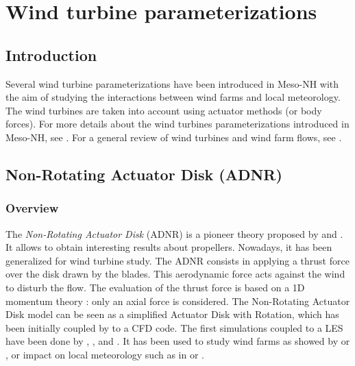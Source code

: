 
\chapter{Wind turbine parameterizations}
\minitoc

\section{Introduction}

Several wind turbine parameterizations have been introduced in Meso-NH with the aim of studying the interactions between wind farms and local meteorology. The wind turbines are taken into account using actuator methods (or body forces). For more details about the wind turbines parameterizations introduced in Meso-NH, see \citet{joulin2019modelisation}. For a general review of wind turbines and wind farm flows, see \citet{porte2020wind}.

\section{Non-Rotating Actuator Disk (ADNR)}

\subsection{Overview}
The \textit{Non-Rotating Actuator Disk} (ADNR) is a pioneer theory proposed by \citet{rankine1865mechanical} and \citet{froude1889part}. It allows to obtain interesting results about propellers. Nowadays, it has been generalized for wind turbine study.
\medbreak
The ADNR consists in applying a thrust force over the disk drawn by the blades. This aerodynamic force acts against the wind to disturb the flow. The evaluation of the thrust force is based on a 1D momentum theory : only an axial force is considered. The Non-Rotating Actuator Disk model can be seen as a simplified Actuator Disk with Rotation, which has been initially coupled by \citet{sorensen1992unsteady} to a CFD code.
\medbreak
The first simulations coupled to a LES have been done by \citet{jimenez2007advances}, \citet{jimenez2008large}, and \citet{wu2011large}. It has been used to study wind farms as showed by \citet{wu2015modeling} or \citet{shamsoddin2017large}, or impact on local meteorology such as in \citet{calaf2010large} or \citet{calaf2011large}.


